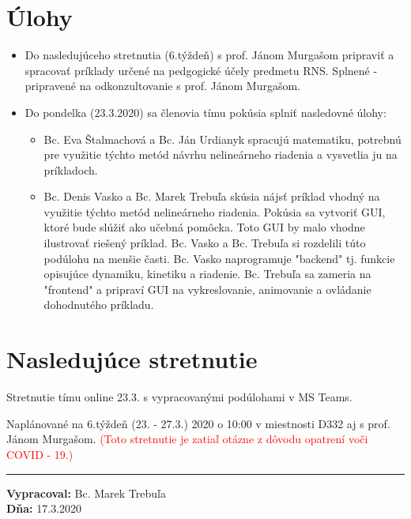     \section*{Úlohy}
    \begin{itemize}
    	\item Do nasledujúceho stretnutia (6.týždeň) s prof. Jánom Murgašom pripraviť a spracovať príklady určené na pedgogické účely predmetu RNS. \textcolor{OliveGreen}{Splnené - pripravené na odkonzultovanie s prof. Jánom Murgašom.}
    	\item Do pondelka (23.3.2020) sa členovia tímu pokúsia splniť nasledovné úlohy:
    	\begin{itemize}
    		\item Bc. Eva Štalmachová a Bc. Ján Urdianyk spracujú matematiku, potrebnú pre využitie týchto metód návrhu nelineárneho riadenia a vysvetlia ju na príkladoch.
    		\item Bc. Denis Vasko a Bc. Marek Trebuľa skúsia nájsť príklad vhodný na využitie týchto metód nelineárneho riadenia. Pokúsia sa vytvoriť GUI, ktoré bude slúžiť ako učebná pomôcka. Toto GUI by malo vhodne ilustrovať riešený príklad. Bc. Vasko a Bc. Trebuľa si rozdelili túto podúlohu na menšie časti. Bc. Vasko naprogramuje "backend" tj. funkcie opisujúce dynamiku, kinetiku a riadenie. Bc. Trebuľa sa zameria na "frontend" a pripraví GUI na vykreslovanie, animovanie a ovládanie dohodnutého príkladu.    		
    	\end{itemize}
    \end{itemize}

    \section*{Nasledujúce stretnutie}
    
    Stretnutie tímu online 23.3. s vypracovanými podúlohami v MS Teams.

    Naplánované na 6.týždeň (23. - 27.3.) 2020 o 10:00 v miestnosti D332 aj s prof. Jánom Murgašom. \textcolor{red}{(Toto stretnutie je zatiaľ otázne z dôvodu opatrení voči COVID - 19.)}
    
    \noindent\rule{15cm}{0.4pt}
   {\small 	\textbf{Vypracoval:} Bc. Marek Trebuľa\\
   \textbf{Dňa:} 17.3.2020 }
    

